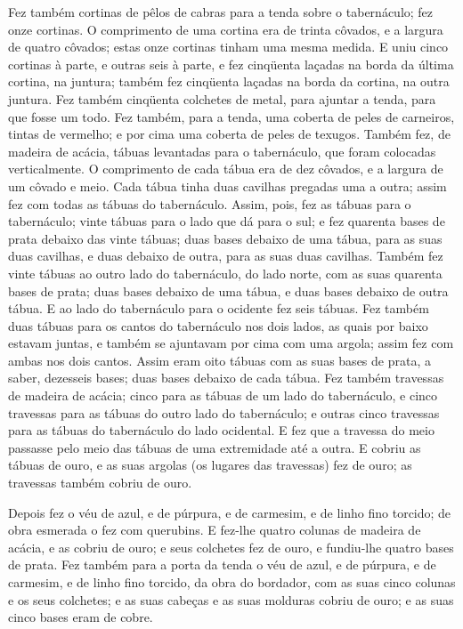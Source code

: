 Fez também cortinas de pêlos de cabras para a tenda sobre o
tabernáculo; fez onze cortinas. O comprimento de uma cortina
era de trinta côvados, e a largura de quatro côvados; estas onze
cortinas tinham uma mesma medida. E uniu cinco cortinas à
parte, e outras seis à parte, e fez cinqüenta laçadas na
borda da última cortina, na juntura; também fez cinqüenta laçadas na
borda da cortina, na outra juntura. Fez também cinqüenta
colchetes de metal, para ajuntar a tenda, para que fosse um todo.
Fez também, para a tenda, uma coberta de peles de carneiros,
tintas de vermelho; e por cima uma coberta de peles de texugos.
Também fez, de madeira de acácia, tábuas levantadas para o
tabernáculo, que foram colocadas verticalmente. O comprimento
de cada tábua era de dez côvados, e a largura de um côvado e meio.
Cada tábua tinha duas cavilhas pregadas uma a outra; assim
fez com todas as tábuas do tabernáculo. Assim, pois, fez as
tábuas para o tabernáculo; vinte tábuas para o lado que dá para o
sul; e fez quarenta bases de prata debaixo das vinte tábuas;
duas bases debaixo de uma tábua, para as suas duas cavilhas, e duas
debaixo de outra, para as suas duas cavilhas. Também fez
vinte tábuas ao outro lado do tabernáculo, do lado norte, com
as suas quarenta bases de prata; duas bases debaixo de uma tábua, e
duas bases debaixo de outra tábua. E ao lado do tabernáculo
para o ocidente fez seis tábuas. Fez também duas tábuas para
os cantos do tabernáculo nos dois lados, as quais por baixo
estavam juntas, e também se ajuntavam por cima com uma argola; assim
fez com ambas nos dois cantos. Assim eram oito tábuas com as
suas bases de prata, a saber, dezesseis bases; duas bases debaixo de
cada tábua. Fez também travessas de madeira de acácia; cinco
para as tábuas de um lado do tabernáculo, e cinco travessas
para as tábuas do outro lado do tabernáculo; e outras cinco
travessas para as tábuas do tabernáculo do lado ocidental. E
fez que a travessa do meio passasse pelo meio das tábuas de uma
extremidade até a outra. E cobriu as tábuas de ouro, e as
suas argolas (os lugares das travessas) fez de ouro; as travessas
também cobriu de ouro.

Depois fez o véu de azul, e de púrpura, e de carmesim, e de linho
fino torcido; de obra esmerada o fez com querubins. E fez-lhe
quatro colunas de madeira de acácia, e as cobriu de ouro; e seus
colchetes fez de ouro, e fundiu-lhe quatro bases de prata.
Fez também para a porta da tenda o véu de azul, e de púrpura,
e de carmesim, e de linho fino torcido, da obra do bordador,
com as suas cinco colunas e os seus colchetes; e as suas
cabeças e as suas molduras cobriu de ouro; e as suas cinco bases
eram de cobre.

